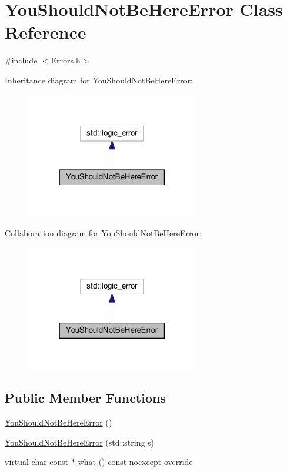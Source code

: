 \hypertarget{class_you_should_not_be_here_error}{}\section{You\+Should\+Not\+Be\+Here\+Error Class Reference}
\label{class_you_should_not_be_here_error}


{\ttfamily \#include $<$Errors.\+h$>$}



Inheritance diagram for You\+Should\+Not\+Be\+Here\+Error\+:
\nopagebreak
\begin{figure}[H]
\begin{center}
\leavevmode
\includegraphics[width=214pt]{class_you_should_not_be_here_error__inherit__graph}
\end{center}
\end{figure}


Collaboration diagram for You\+Should\+Not\+Be\+Here\+Error\+:
\nopagebreak
\begin{figure}[H]
\begin{center}
\leavevmode
\includegraphics[width=214pt]{class_you_should_not_be_here_error__coll__graph}
\end{center}
\end{figure}
\subsection*{Public Member Functions}
\begin{DoxyCompactItemize}
\item 
\hyperlink{class_you_should_not_be_here_error_a07ad83d10d42cb5edea6e0a16ffcd225}{You\+Should\+Not\+Be\+Here\+Error} ()
\item 
\hyperlink{class_you_should_not_be_here_error_ad4ccc32bd90603898ae927ef90b36651}{You\+Should\+Not\+Be\+Here\+Error} (std\+::string s)
\item 
virtual char const  $\ast$ \hyperlink{class_you_should_not_be_here_error_ae21a5eec0be24796dde99ca24fc7ade6}{what} () const noexcept override
\end{DoxyCompactItemize}


